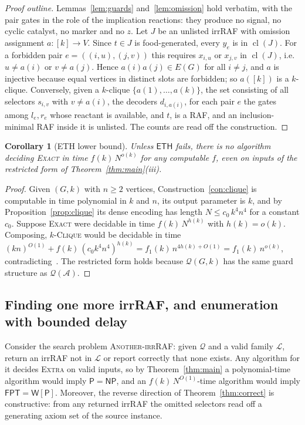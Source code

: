 \documentclass[11pt,a4paper]{article}
\theoremstyle{plain}
\newtheorem{corollary}[theorem]{Corollary}
\theoremstyle{definition}
\theoremstyle{remark}
\newcommand{\cl}{\operatorname{cl}}
\newcommand{\Exact}{\textup{\textsc{Exact}}}
\newcommand{\Extra}{\textup{\textsc{Extra}}}
\newcommand{\Clique}{\textup{\textsc{Clique}}}
\newcommand{\NP}{\mathsf{NP}}
\newcommand{\Ptime}{\mathsf{P}}
\newcommand{\FPT}{\mathsf{FPT}}
\newcommand{\WP}{\mathsf{W[P]}}
\newcommand{\ETH}{\mathsf{ETH}}
\newcommand{\cL}{\mathcal{L}}
\newcommand{\cA}{\mathcal{A}}
\newcommand{\cQ}{\mathcal{Q}}
\newcommand{\Nlen}{N}
\begin{document}
\begin{proof}[Proof outline]
Lemmas~\ref{lem:guards} and~\ref{lem:omission} hold verbatim, with the pair gates in the role of the implication reactions: they produce no signal, no cyclic catalyst, no marker and no $z$. Let $J$ be an unlisted irrRAF with omission assignment $a\colon[k]\to V$. Since $t\in J$ is food-generated, every $y_e$ is in $\cl(J)$. For a forbidden pair $e=((i,u),(j,v))$ this requires $x_{i,u}$ or $x_{j,v}$ in $\cl(J)$, i.e.\ $u\ne a(i)$ or $v\ne a(j)$. Hence $a(i)a(j)\in E(G)$ for all $i\ne j$, and $a$ is injective because equal vertices in distinct slots are forbidden; so $a([k])$ is a $k$-clique. Conversely, given a $k$-clique $\{a(1),\dots,a(k)\}$, the set consisting of all selectors $s_{i,v}$ with $v\ne a(i)$, the decoders $d_{i,a(i)}$, for each pair $e$ the gates among $l_e,r_e$ whose reactant is available, and $t$, is a RAF, and an inclusion-minimal RAF inside it is unlisted. The counts are read off the construction.
\end{proof}

\begin{corollary}[ETH lower bound]\label{cor:eth}
Unless $\ETH$ fails, there is no algorithm deciding \Exact{} in time $f(k)\,\Nlen^{o(k)}$ for any computable $f$, even on inputs of the restricted form of Theorem~\ref{thm:main}\textup{(iii)}.
\end{corollary}

\begin{proof}
Given $(G,k)$ with $n\ge2$ vertices, Construction~\ref{con:clique} is computable in time polynomial in $k$ and $n$, its output parameter is $k$, and by Proposition~\ref{prop:clique} its dense encoding has length $\Nlen\le c_0\,k^4n^4$ for a constant $c_0$. Suppose \Exact{} were decidable in time $f(k)\,\Nlen^{h(k)}$ with $h(k)=o(k)$. Composing, $k$-\Clique{} would be decidable in time $(kn)^{O(1)}+f(k)\,(c_0k^4n^4)^{h(k)}=f_1(k)\,n^{4h(k)+O(1)}=f_1(k)\,n^{o(k)}$, contradicting~\cite{chen2006strong}. The restricted form holds because $\cQ(G,k)$ has the same guard structure as $\cQ(\cA)$.
\end{proof}

\subsection{Finding one more irrRAF, and enumeration with bounded delay}

Consider the search problem \textsc{Another-irrRAF}: given $\cQ$ and a valid family $\cL$, return an irrRAF not in $\cL$ or report correctly that none exists. Any algorithm for it decides \Extra{} on valid inputs, so by Theorem~\ref{thm:main} a polynomial-time algorithm would imply $\Ptime=\NP$, and an $f(k)\,\Nlen^{O(1)}$-time algorithm would imply $\FPT=\WP$. Moreover, the reverse direction of Theorem~\ref{thm:correct} is constructive: from any returned irrRAF the omitted selectors read off a generating axiom set of the source instance.
\end{document}
